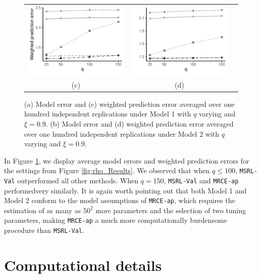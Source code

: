 \documentclass[12pt]{article}
\begin{document}
\begin{figure}[t!]
\begin{tabular}{ccc}
 \includegraphics[width=6.9cm]{Plots/NormalHet_qAR1_PredErr_April.pdf} &   \includegraphics[width=6.9cm]{Plots/NormalHet_qConst_PredErr_April.pdf} &  \\
(c)  & (d)  & \\[6pt]
\end{tabular}
\caption{(a) Model error and (c) weighted prediction error averaged over one hundred independent replications under Model 1 with $q$ varying and $\xi = 0.9$. (b) Model error and (d) weighted prediction error averaged over one hundred independent replications under Model 2 with $q$ varying and $\xi = 0.9$.}\label{fig:q_Results}
\end{figure} 

In Figure \ref{fig:q_Results}, we display average model errors and weighted prediction errors for the settings from Figure \ref{fig:rho_Results}. We observed that when $q \leq 100$, \texttt{MSRL-Val} outperformed all other methods. When $q = 150$, \texttt{MSRL-Val} and \texttt{MRCE-ap} performedvery similarly. It is again worth pointing out that both Model 1 and Model 2 conform to the model assumptions of \texttt{MRCE-ap}, which requires the estimation of as many as $50^2$ more parameters and the selection of two tuning parameters, making \texttt{MRCE-ap} a much more computationally burdensome procedure than \texttt{MSRL-Val}.


\section{Computational details}
\end{document}
